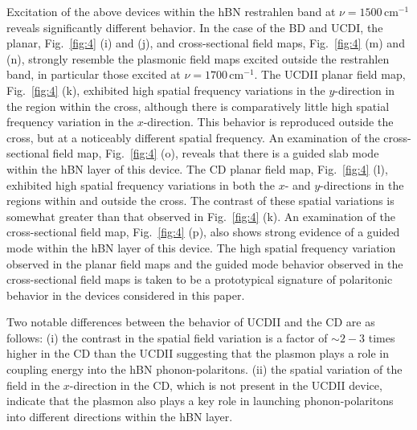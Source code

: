 \documentclass[reprint,
amsmath,amssymb,
aip,
jap,
floatfix,]{revtex4-2}
\begin{document}
				Excitation of the above devices within the hBN restrahlen band at $\nu = 1500 \, \mathrm{cm}^{-1}$ reveals significantly different behavior. In the case of the BD and UCDI, the planar, Fig.~\ref{fig:4} (i) and (j), and cross-sectional field maps, Fig.~\ref{fig:4} (m) and (n), strongly resemble the plasmonic field maps excited outside the restrahlen band, in particular those excited at $\nu = 1700 \, \mathrm{cm}^{-1}$. The UCDII planar field map, Fig.~\ref{fig:4} (k), exhibited high spatial frequency variations in the $y$-direction in the region within the cross, although there is comparatively little high spatial frequency variation in the $x$-direction. This behavior is reproduced outside the cross, but at a noticeably different spatial frequency. An examination of the cross-sectional field map, Fig.~\ref{fig:4} (o), reveals that there is a guided slab mode within the hBN layer of this device. The CD planar field map, Fig.~\ref{fig:4} (l), exhibited high spatial frequency variations in both the $x$- and $y$-directions in the regions within and outside the cross. The contrast of these spatial variations is somewhat greater than that observed in Fig.~\ref{fig:4} (k). An examination of the cross-sectional field map, Fig.~\ref{fig:4} (p), also shows strong evidence of a guided mode within the hBN layer of this device. The high spatial frequency variation observed in the planar field maps and the guided mode behavior observed in the cross-sectional field maps is taken to be a prototypical signature of polaritonic behavior in the devices considered in this paper.

				Two notable differences between the behavior of UCDII and the CD are as follows: (i) the contrast in the spatial field variation is a factor of $\sim 2-3$ times higher in the CD than the UCDII suggesting that the plasmon plays a role in coupling energy into the hBN phonon-polaritons. (ii) the spatial variation of the field in the $x$-direction in the CD, which is not present in the UCDII device, indicate that the plasmon also plays a key role in launching phonon-polaritons into different directions within the hBN layer.
\end{document}

